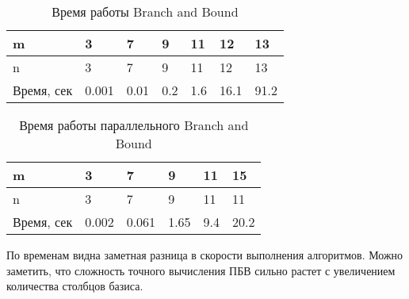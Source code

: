 \begin{table}[H]
  \caption{Время работы Branch and Bound}
  \centering
  \begin{tabular}{ | l | l | l | l | l | l | l | }
  \hline
  m & 3 & 7 & 9 & 11 & 12 & 13 \\ \hline
  n & 3 & 7 & 9 & 11 & 12 & 13 \\ \hline
  Время, сек & 0.001 & 0.01 & 0.2 & 1.6 & 16.1 & 91.2 \\ \hline
  \end{tabular}
  \label{table:BB}
\end{table}

\begin{table}[H]
  \caption{Время работы параллельного Branch and Bound}
  \centering
  \begin{tabular}{ | l | l | l | l | l | l | }
  \hline
  m & 3 & 7 & 9 & 11 & 15 \\ \hline
  n & 3 & 7 & 9 & 11 & 11 \\ \hline
  Время, сек & 0.002 & 0.061 & 1.65 & 9.4 & 20.2 \\ \hline
  \end{tabular}
  \label{table:BB_parallel}
\end{table}

По временам видна заметная разница в скорости выполнения алгоритмов. Можно заметить, что сложность точного вычисления ПБВ сильно растет с увеличением количества столбцов базиса.

\clearpage